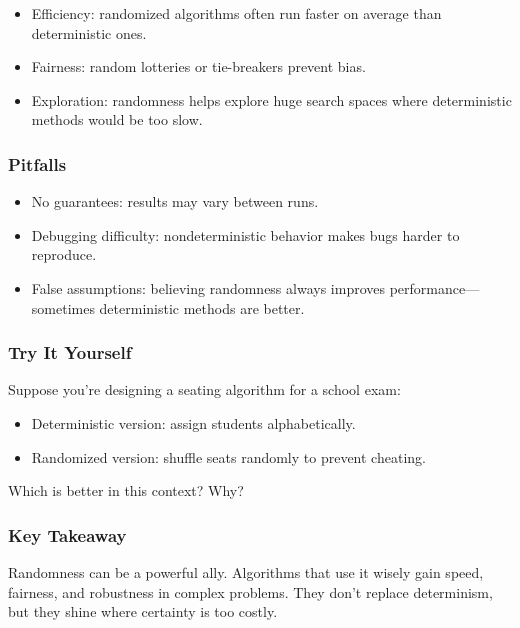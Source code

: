 \documentclass[
  letterpaper,
  DIV=11,
  numbers=noendperiod]{scrreprt}
\providecommand{\tightlist}{%
  \setlength{\itemsep}{0pt}\setlength{\parskip}{0pt}}
\begin{document}
\begin{itemize}
\tightlist
\item
  Efficiency: randomized algorithms often run faster on average than
  deterministic ones.
\item
  Fairness: random lotteries or tie-breakers prevent bias.
\item
  Exploration: randomness helps explore huge search spaces where
  deterministic methods would be too slow.
\end{itemize}

\subsubsection{Pitfalls}\label{pitfalls-26}

\begin{itemize}
\tightlist
\item
  No guarantees: results may vary between runs.
\item
  Debugging difficulty: nondeterministic behavior makes bugs harder to
  reproduce.
\item
  False assumptions: believing randomness always improves
  performance---sometimes deterministic methods are better.
\end{itemize}

\subsubsection{Try It Yourself}\label{try-it-yourself-29}

Suppose you're designing a seating algorithm for a school exam:

\begin{itemize}
\tightlist
\item
  Deterministic version: assign students alphabetically.
\item
  Randomized version: shuffle seats randomly to prevent cheating.
\end{itemize}

Which is better in this context? Why?

\subsubsection{Key Takeaway}\label{key-takeaway-28}

Randomness can be a powerful ally. Algorithms that use it wisely gain
speed, fairness, and robustness in complex problems. They don't replace
determinism, but they shine where certainty is too costly.
\end{document}
